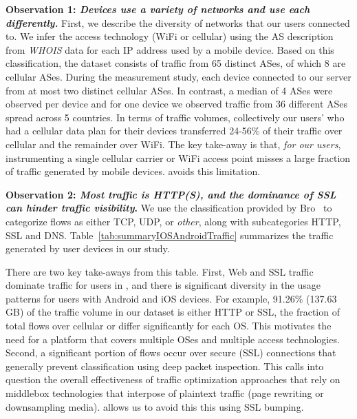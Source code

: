 \noindent\textbf{Observation 1: \emph{Devices use a variety of networks and use each differently.}} First, we describe the diversity 
of networks that our users connected to. 
We infer the access technology (WiFi or cellular) using the AS description from \emph{WHOIS} data for each IP address used by a mobile device.
Based on this classification, the \mobWild dataset consists of traffic from 65 distinct ASes, of which 8 are cellular ASes.
During the measurement study, each device connected to our \platname server from at most two distinct cellular ASes. 
In contrast, a median of 4 \wifi ASes were observed per device and for one device we observed traffic from 36 different \wifi ASes spread across 5 countries.
In terms of traffic volumes, collectively our users' who had a cellular data plan for their devices transferred 24-56\% of their traffic over cellular and the remainder over WiFi. 
The key take-away is that, \emph{for our users}, instrumenting a single cellular carrier or WiFi access point misses a 
large fraction of traffic generated by mobile devices. \meddle avoids this limitation.

\noindent\textbf{Observation 2: \emph{Most traffic is HTTP(S), and the dominance of SSL can hinder traffic visibility}.} We use the classification 
provided by Bro~\cite{bro} to categorize flows as either TCP, UDP, or \emph{other}, along with subcategories HTTP, SSL and DNS.
Table~\ref{tab:summaryIOSAndroidTraffic} summarizes the traffic generated by user devices in our study. 

There are two key  
take-aways from this table. First, Web and SSL traffic dominate traffic for users in \mobWild, 
and there is significant diversity in the usage patterns for 
users with Android and iOS devices. For example, 91.26\% (137.63 GB) of the traffic volume in our \mobWild dataset is either HTTP or SSL, 
the fraction of total flows over cellular or \wifi differ significantly for each OS. This motivates the need for a platform that covers 
multiple OSes and multiple access technologies. Second, a significant portion of flows occur over secure (SSL) connections 
that generally prevent classification using deep packet inspection. This calls into question 
the overall effectiveness of traffic optimization approaches that rely 
on middlebox technologies that interpose of plaintext traffic (\eg page rewriting or 
downsampling media). \meddle allows us to avoid this this using SSL bumping.


